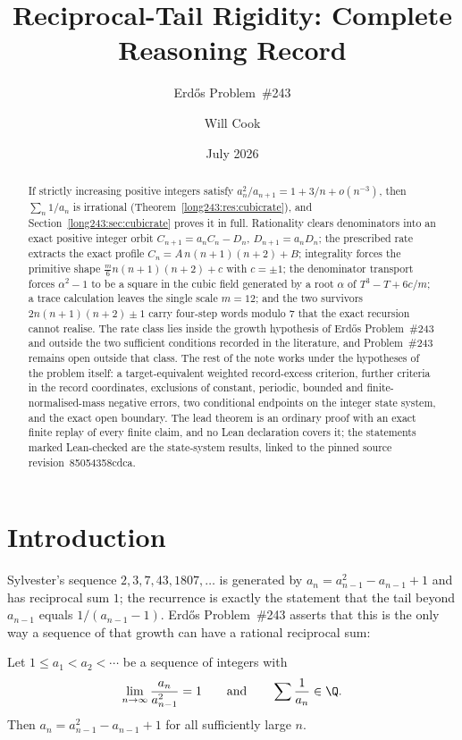 \documentclass[11pt]{article}
\title{Reciprocal-Tail Rigidity: Complete Reasoning Record}
\subtitle{Erd\H{o}s Problem~\#243}
\author{Will Cook}
\date{July 2026}
\renewcommand{\commitshort}{85054358cdca}
\begin{document}
\maketitle
\noteprovenance

\begin{abstract}
\noindent
If strictly increasing positive integers satisfy
$a_n^2/a_{n+1}=1+3/n+o(n^{-3})$, then $\sum_n1/a_n$ is irrational
(Theorem~\ref{long243:res:cubicrate}), and Section~\ref{long243:sec:cubicrate} proves it in
full.  Rationality clears denominators into an exact positive integer orbit
$C_{n+1}=a_nC_n-D_n$, $D_{n+1}=a_nD_n$; the prescribed rate extracts the exact
profile $C_n=A\,n(n+1)(n+2)+B$; integrality forces the primitive shape
$\frac m6n(n+1)(n+2)+c$ with $c=\pm1$; the denominator transport forces
$\alpha^2-1$ to be a square in the cubic field generated by a root $\alpha$ of
$T^3-T+6c/m$; a trace calculation leaves the single scale $m=12$; and the two
survivors $2n(n+1)(n+2)\pm1$ carry four-step words modulo $7$ that the exact
recursion cannot realise.  The rate class lies inside the growth hypothesis of
Erd\H{o}s Problem~\#243 and outside the two sufficient conditions recorded in
the literature, and Problem~\#243 remains open outside that class.  The rest of
the note works under the hypotheses of the problem itself: a target-equivalent
weighted record-excess criterion, further criteria in the record coordinates,
exclusions of constant, periodic, bounded and finite-normalised-mass negative
errors, two conditional endpoints on the integer state system, and the exact
open boundary.  The lead theorem is an ordinary proof with an exact finite
replay of every finite claim, and no Lean declaration covers it; the
statements marked Lean-checked are the state-system results, linked to the
pinned source revision~\commitshort.
\end{abstract}

\section{Introduction}\label{long243:sec:problem}

Sylvester's sequence $2,3,7,43,1807,\ldots$ is generated by
$a_{n}=a_{n-1}^{2}-a_{n-1}+1$ and has reciprocal sum $1$; the recurrence is
exactly the statement that the tail beyond $a_{n-1}$ equals $1/(a_{n-1}-1)$.
Erd\H{o}s Problem~\#243 asserts that this is the only way a sequence of that
growth can have a rational reciprocal sum:

\begin{problem}[Erd\H{o}s \#243]\label{long243:res:problem}
Let $1\le a_1<a_2<\cdots$ be a sequence of integers with
\[
 \lim_{n\to\infty}\frac{a_n}{a_{n-1}^{2}}=1
 \qquad\text{and}\qquad
 \sum\frac{1}{a_n}\in\Q .
\]
Then $a_n=a_{n-1}^{2}-a_{n-1}+1$ for all sufficiently large $n$.
\end{problem}
\end{document}
